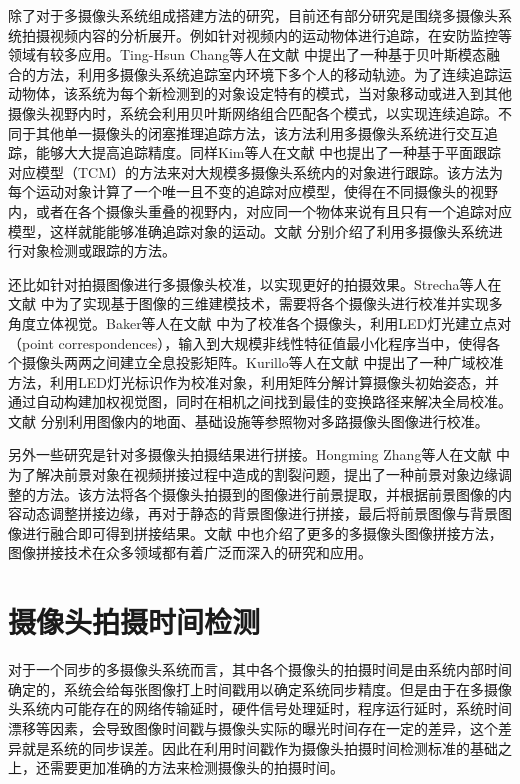 除了对于多摄像头系统组成搭建方法的研究，目前还有部分研究是围绕多摄像头系统拍摄视频内容的分析展开。例如针对视频内的运动物体进行追踪，在安防监控等领域有较多应用。Ting-Hsun Chang等人在文献 \cite{11} 中提出了一种基于贝叶斯模态融合的方法，利用多摄像头系统追踪室内环境下多个人的移动轨迹。为了连续追踪运动物体，该系统为每个新检测到的对象设定特有的模式，当对象移动或进入到其他摄像头视野内时，系统会利用贝叶斯网络组合匹配各个模式，以实现连续追踪。不同于其他单一摄像头的闭塞推理追踪方法，该方法利用多摄像头系统进行交互追踪，能够大大提高追踪精度。同样Kim等人在文献 \cite{12} 中也提出了一种基于平面跟踪对应模型（TCM）的方法来对大规模多摄像头系统内的对象进行跟踪。该方法为每个运动对象计算了一个唯一且不变的追踪对应模型，使得在不同摄像头的视野内，或者在各个摄像头重叠的视野内，对应同一个物体来说有且只有一个追踪对应模型，这样就能能够准确追踪对象的运动。文献 \cite{zha2013detecting, saini2014w3, wang2013intelligent} 分别介绍了利用多摄像头系统进行对象检测或跟踪的方法。

还比如针对拍摄图像进行多摄像头校准，以实现更好的拍摄效果。Strecha等人在文献 \cite{13} 中为了实现基于图像的三维建模技术，需要将各个摄像头进行校准并实现多角度立体视觉。Baker等人在文献 \cite{14} 中为了校准各个摄像头，利用LED灯光建立点对（point correspondences），输入到大规模非线性特征值最小化程序当中，使得各个摄像头两两之间建立全息投影矩阵。Kurillo等人在文献 \cite{15} 中提出了一种广域校准方法，利用LED灯光标识作为校准对象，利用矩阵分解计算摄像头初始姿态，并通过自动构建加权视觉图，同时在相机之间找到最佳的变换路径来解决全局校准。文献 \cite{theriault2014protocol, knorr2013online, heng2014infrastructure} 分别利用图像内的地面、基础设施等参照物对多路摄像头图像进行校准。

另外一些研究是针对多摄像头拍摄结果进行拼接。Hongming Zhang等人在文献 \cite{16} 中为了解决前景对象在视频拼接过程中造成的割裂问题，提出了一种前景对象边缘调整的方法。该方法将各个摄像头拍摄到的图像进行前景提取，并根据前景图像的内容动态调整拼接边缘，再对于静态的背景图像进行拼接，最后将前景图像与背景图像进行融合即可得到拼接结果。文献 \cite{malesa2014multi, zhong2014color, lu2016photometric} 中也介绍了更多的多摄像头图像拼接方法，图像拼接技术在众多领域都有着广泛而深入的研究和应用。

\section{摄像头拍摄时间检测}

对于一个同步的多摄像头系统而言，其中各个摄像头的拍摄时间是由系统内部时间确定的，系统会给每张图像打上时间戳用以确定系统同步精度。但是由于在多摄像头系统内可能存在的网络传输延时，硬件信号处理延时，程序运行延时，系统时间漂移等因素，会导致图像时间戳与摄像头实际的曝光时间存在一定的差异，这个差异就是系统的同步误差。因此在利用时间戳作为摄像头拍摄时间检测标准的基础之上，还需要更加准确的方法来检测摄像头的拍摄时间。

